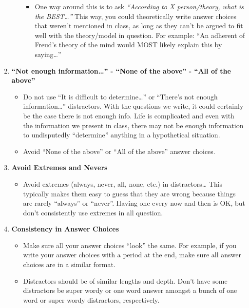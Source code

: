 \documentclass[
]{article}
\providecommand{\tightlist}{%
  \setlength{\itemsep}{0pt}\setlength{\parskip}{0pt}}
\begin{document}
\begin{enumerate}
\begin{itemize}
    \begin{itemize}
    \tightlist
    \item
      One way around this is to ask \emph{``According to X person/theory, what is the BEST\ldots{}''} This way, you could theoretically write answer choices that weren't mentioned in class, as long as they can't be argued to fit well with the theory/model in question. For example: ``An adherent of Freud's theory of the mind would MOST likely explain this by saying\ldots{}''
    \end{itemize}
  \end{itemize}
\item
  \textbf{``Not enough information\ldots{}'' - ``None of the above'' - ``All of the above''}

  \begin{itemize}
  \tightlist
  \item
    Do not use ``It is difficult to determine\ldots{}'' or ``There's not enough information\ldots{}'' distractors. With the questions we write, it could certainly be the case there is not enough info. Life is complicated and even with the information we present in class, there may not be enough information to undisputedly ``determine'' anything in a hypothetical situation.
  \item
    Avoid ``None of the above'' or ``All of the above'' answer choices.
  \end{itemize}
\item
  \textbf{Avoid Extremes and Nevers}

  \begin{itemize}
  \tightlist
  \item
    Avoid extremes (always, never, all, none, etc.) in distractors\ldots{} This typically makes them easy to guess that they are wrong because things are rarely ``always'' or ``never''. Having one every now and then is OK, but don't consistently use extremes in all question.
  \end{itemize}
\item
  \textbf{Consistency in Answer Choices}

  \begin{itemize}
  \tightlist
  \item
    Make sure all your answer choices ``look'' the same. For example, if you write your answer choices with a period at the end, make sure all answer choices are in a similar format.
  \item
    Distractors should be of similar lengths and depth. Don't have some distractors be super wordy or one word answer amongst a bunch of one word or super wordy distractors, respectively.
  \end{itemize}
\end{enumerate}
\end{document}
